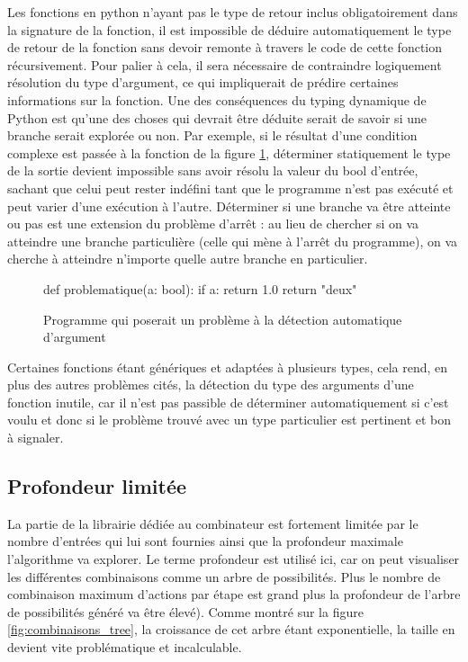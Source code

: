 \documentclass[a4paper]{report}
\begin{document}
Les fonctions en python n'ayant pas le type de retour inclus obligatoirement dans la signature de la fonction, il est impossible de déduire automatiquement le type de retour de la fonction sans devoir remonte  à travers le code de cette fonction récursivement.
Pour palier à cela, il sera nécessaire de contraindre logiquement résolution du type d'argument, ce qui impliquerait de prédire certaines informations sur la fonction.
Une des conséquences du typing dynamique de Python est qu'une des choses qui devrait être déduite serait de savoir si une branche serait explorée ou non.
Par exemple, si le résultat d'une condition complexe est passée à la fonction de la figure \ref{fig:condition_complexe_résolution}, déterminer statiquement le type de la sortie devient impossible sans avoir résolu la valeur du bool d'entrée, sachant que celui peut rester indéfini tant que le programme n'est pas exécuté et peut varier d'une exécution à l'autre.
Déterminer si une branche va être atteinte ou pas est une extension du problème d'arrêt \cite{burkholder1987halting}: au lieu de chercher si on va atteindre une branche particulière (celle qui mène à l'arrêt du programme), on va cherche à atteindre n'importe quelle autre branche en particulier.

\begin{figure}[ht]
\begin{python}

def problematique(a: bool):
	if a:
		return 1.0
	return "deux"
\end{python}
	\caption{Programme qui poserait un problème à la détection automatique d'argument}
	
	\label{fig:condition_complexe_résolution}
\end{figure}

Certaines fonctions étant génériques et adaptées à plusieurs types, cela rend, en plus des autres problèmes cités, la détection du type des arguments d'une fonction inutile, car il n'est pas passible de déterminer automatiquement si c'est voulu et donc si le problème trouvé avec un type particulier est pertinent et bon à signaler.



\subsection{Profondeur limitée}
La partie de la librairie dédiée au combinateur est fortement limitée par le nombre d'entrées qui lui sont fournies ainsi que la profondeur maximale l'algorithme va explorer.
Le terme profondeur est utilisé ici, car on peut visualiser les différentes combinaisons comme un arbre de possibilités.
Plus le nombre de combinaison maximum d'actions par étape est grand plus la profondeur de l'arbre de possibilités généré va être élevé).
Comme montré sur la figure \ref{fig:combinaisons_tree}, la croissance de cet arbre étant exponentielle, la taille en devient vite problématique et incalculable.
\end{document}
